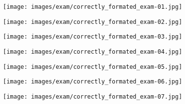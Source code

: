 \FloatBarrier
\begin{figure}[!ht]
    \begin{center}
    \advance\leftskip-3cm
    \advance\rightskip-3cm
    \texttt{[image: images/exam/correctly\_formated\_exam-01.jpg]}
    \label{fig:correctly_formated_exam-01}
\end{center}
\end{figure}

\begin{figure}[!ht]
    \begin{center}
    \advance\leftskip-3cm
    \advance\rightskip-3cm
    \texttt{[image: images/exam/correctly\_formated\_exam-02.jpg]}
    \label{fig:correctly_formated_exam-02}
\end{center}
\end{figure}

\begin{figure}[!ht]
    \begin{center}
    \advance\leftskip-3cm
    \advance\rightskip-3cm
    \texttt{[image: images/exam/correctly\_formated\_exam-03.jpg]}
    \label{fig:correctly_formated_exam-03}
\end{center}
\end{figure}
\begin{figure}[!ht]
    \begin{center}
    \advance\leftskip-3cm
    \advance\rightskip-3cm
    \texttt{[image: images/exam/correctly\_formated\_exam-04.jpg]}
    \label{fig:correctly_formated_exam-04}
\end{center}
\end{figure}
\begin{figure}[!ht]
    \begin{center}
    \advance\leftskip-3cm
    \advance\rightskip-3cm
    \texttt{[image: images/exam/correctly\_formated\_exam-05.jpg]}
    \label{fig:correctly_formated_exam-05}
\end{center}
\end{figure}
\begin{figure}[!ht]
    \begin{center}
    \advance\leftskip-3cm
    \advance\rightskip-3cm
    \texttt{[image: images/exam/correctly\_formated\_exam-06.jpg]}
    \label{fig:correctly_formated_exam-06}
\end{center}
\end{figure}

\begin{figure}[!ht]
    \begin{center}
    \advance\leftskip-3cm
    \advance\rightskip-3cm
    \texttt{[image: images/exam/correctly\_formated\_exam-07.jpg]}
    \label{fig:correctly_formated_exam-07}
\end{center}
\end{figure}

